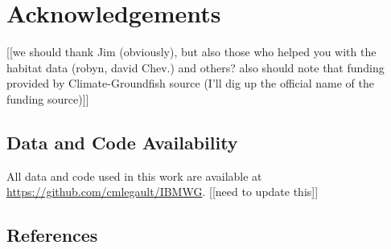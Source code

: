 \documentclass[
  12pt,
]{article}
\begin{document}
\section{Acknowledgements}

{[}{[}we should thank Jim (obviously), but also those who helped you with the habitat data (robyn, david Chev.) and others? also should note that funding provided by Climate-Groundfish source (I'll dig up the official name of the funding source){]}{]}

\hypertarget{data-and-code-availability}{%
\subsection{Data and Code Availability}\label{data-and-code-availability}}

All data and code used in this work are available at \url{https://github.com/cmlegault/IBMWG}. {[}{[}need to update this{]}{]}

\hypertarget{references}{%
\subsection{References}\label{references}}
\end{document}
